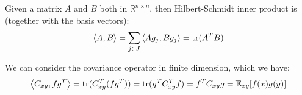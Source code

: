 \begin{lemma}
    Given a matrix $A$ and $B$ both in $\mathbb{R}^{n\times n}$, then Hilbert-Schmidt inner product is (together with the basis vectors):
    \begin{equation*}
        \left\langle A, B \right\rangle = \sum_{j\in J} \left\langle Ag_j, Bg_j \right\rangle = \operatorname{tr}(A^TB) 
    \end{equation*}
\end{lemma}

\begin{remark}
    We can consider the covariance operator in finite dimension, which we have: 
    \begin{equation*}
        \left\langle C_{xy}, fg^T \right\rangle = \operatorname{tr}(C_{xy}^T(fg^T)) = \operatorname{tr}(g^TC_{xy}^Tf) = f^TC_{xy}g = \mathbb{E}_{xy}[f(x)g(y)]
    \end{equation*}
\end{remark}

